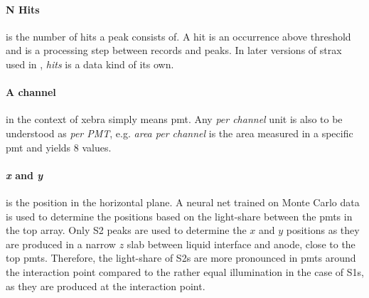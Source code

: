 \paragraph{N Hits} is the number of hits a peak consists of.
A hit is an occurrence above threshold and is a processing step between records and peaks.
In later versions of strax used in \nton, \emph{hits} is a data kind of its own.

\paragraph{A channel} in the context of \gls{xebra} simply means \gls{pmt}.
Any \emph{per channel} unit is also to be understood as \emph{per PMT}, e.g. \emph{area per channel} is the area measured in a specific \gls{pmt} and yields 8 values.

\paragraph{\emph{x} and \emph{y}} is the position in the horizontal plane.
A neural net trained on Monte Carlo data is used to determine the positions based on the light-share between the \glspl{pmt} in the top array.  %
Only S2 peaks are used to determine the $ x $ and $ y $ positions as they are produced in a narrow $ z $ slab between liquid interface and anode, close to the top \glspl{pmt}.
Therefore, the light-share of S2s are more pronounced in \glspl{pmt} around the interaction point compared to the rather equal illumination in the case of S1s, as they are produced at the interaction point.


